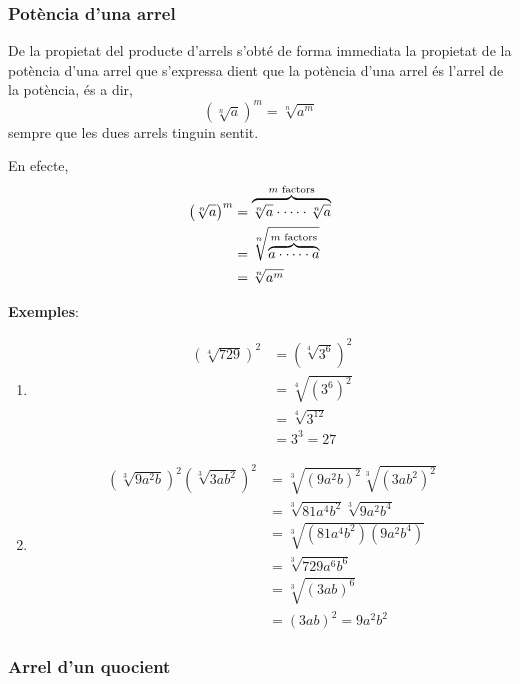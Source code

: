 \subsubsection{Potència d’una arrel}

De la propietat del producte d’arrels s’obté de forma immediata la
propietat de la potència d’una arrel que s’expressa dient que la
potència d’una arrel és l’arrel de la potència, és a dir,%
\begin{equation*}
\left( \sqrt[n]{a}\right) ^{m}=\sqrt[n]{a^{m}}
\end{equation*}%
sempre que les dues arrels tinguin sentit.

En efecte,%
\begin{align*}
\left( \sqrt[n]{a}\right) ^{m} &=\overset{m\text{ factors}}{\overbrace{%
\sqrt[n]{a}\cdot \cdots \cdot \sqrt[n]{a}}} \\
&=\sqrt[n]{\overset{m\text{ factors}}{\overbrace{a\cdot \cdots \cdot a}}}
\\
&=\sqrt[n]{a^{m}}
\end{align*}

\textbf{Exemples}:

\begin{enumerate}
\item 
\begin{align*}
\left( \sqrt[4]{729}\right) ^{2} &=\left( \sqrt[4]{3^{6}}\right) ^{2} \\
&=\sqrt[4]{\left( 3^{6}\right) ^{2}} \\
&=\sqrt[4]{3^{12}} \\
&=3^{3}=27
\end{align*}

\item 
\begin{align*}
\left( \sqrt[3]{9a^{2}b}\right) ^{2}\left( \sqrt[3]{3ab^{2}}\right) ^{2} &=%
\sqrt[3]{\left( 9a^{2}b\right) ^{2}}\sqrt[3]{\left( 3ab^{2}\right) ^{2}} \\
&=\sqrt[3]{81a^{4}b^{2}}\sqrt[3]{9a^{2}b^{4}} \\
&=\sqrt[3]{\left( 81a^{4}b^{2}\right) \left( 9a^{2}b^{4}\right) } \\
&=\sqrt[3]{729a^{6}b^{6}} \\
&=\sqrt[3]{\left( 3ab\right) ^{6}} \\
&=\left( 3ab\right) ^{2}=9a^{2}b^{2}
\end{align*}
\end{enumerate}

\subsubsection{Arrel d’un quocient}

